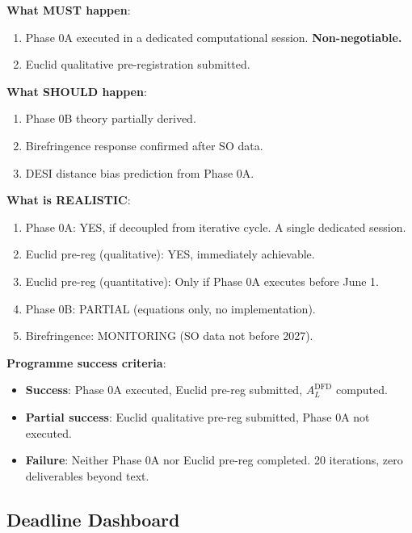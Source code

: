 \documentclass[11pt,a4paper]{article}
\begin{document}
\begin{tcolorbox}[colback=red!5!white, colframe=red!60!black,
  title={Programme Trajectory: 3 Iterations Remaining --- Phase 0A or Failure}]

\textbf{What MUST happen}:
\begin{enumerate}
\item Phase 0A executed in a dedicated computational session. \textbf{Non-negotiable.}
\item Euclid qualitative pre-registration submitted.
\end{enumerate}

\textbf{What SHOULD happen}:
\begin{enumerate}
\item Phase 0B theory partially derived.
\item Birefringence response confirmed after SO data.
\item DESI distance bias prediction from Phase 0A.
\end{enumerate}

\textbf{What is REALISTIC}:
\begin{enumerate}
\item Phase 0A: YES, if decoupled from iterative cycle. A single dedicated session.
\item Euclid pre-reg (qualitative): YES, immediately achievable.
\item Euclid pre-reg (quantitative): Only if Phase 0A executes before June 1.
\item Phase 0B: PARTIAL (equations only, no implementation).
\item Birefringence: MONITORING (SO data not before 2027).
\end{enumerate}

\textbf{Programme success criteria}:
\begin{itemize}
\item \textbf{Success}: Phase 0A executed, Euclid pre-reg submitted, $A_L^{\text{DFD}}$ computed.
\item \textbf{Partial success}: Euclid qualitative pre-reg submitted, Phase 0A not executed.
\item \textbf{Failure}: Neither Phase 0A nor Euclid pre-reg completed. 20 iterations, zero deliverables beyond text.
\end{itemize}
\end{tcolorbox}

\subsection{Deadline Dashboard}
\end{document}
